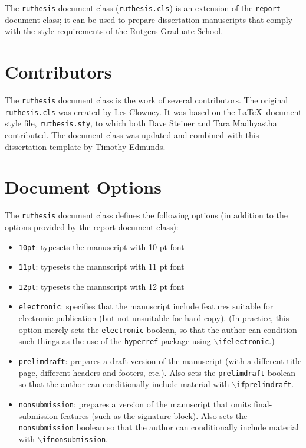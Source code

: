 The \texttt{ruthesis} document class (\href{../ruthesis.cls}{\texttt{ruthesis.cls}}) is an extension of the \texttt{report} document class; it can be used to prepare dissertation manuscripts that comply with the \href{http://gsnb.rutgers.edu/guide.php3}{style requirements} of the Rutgers Graduate School.

\section{Contributors}
The \texttt{ruthesis} document class is the work of several contributors.
The original \texttt{ruthesis.cls} was created by Les Clowney.
It was based on the \LaTeX\ document style file, \texttt{ruthesis.sty}, to which both Dave Steiner and Tara Madhyastha contributed.
The document class was updated and combined with this dissertation template by Timothy Edmunds.

\section{Document Options}
The \texttt{ruthesis} document class defines the following options (in addition to the options provided by the report document class):
\begin{itemize}
\item \texttt{10pt}: typesets the manuscript with 10 pt font
\item \texttt{11pt}: typesets the manuscript with 11 pt font
\item \texttt{12pt}: typesets the manuscript with 12 pt font
\item \texttt{electronic}: specifies that the manuscript include features suitable for electronic publication (but not unsuitable for hard-copy).
    (In practice, this option merely sets the \texttt{electronic} boolean, so that the author can condition such things as the use of the \texttt{hyperref} package using $\backslash$\texttt{ifelec\-tronic}.)
\item \texttt{prelimdraft}: prepares a draft version of the manuscript (with a different title page, different headers and footers, etc.).
    Also sets the \texttt{prelimdraft} boolean so that the author can conditionally include material with $\backslash$\texttt{if\-prelimdraft}.
\item \texttt{nonsubmission}: prepares a version of the manuscript that omits final-submission features (such as the signature block).
    Also sets the \texttt{nonsub\-mission} boolean so that the author can conditionally include material with $\backslash$\texttt{if\-nonsubmission}.
\end{itemize}

